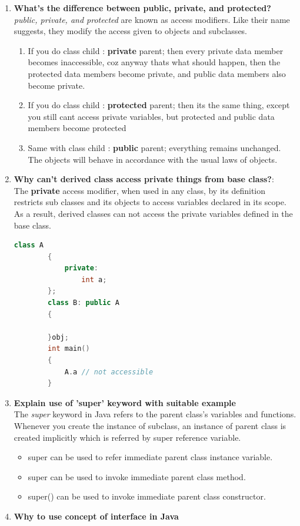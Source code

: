 \documentclass[11pt]{article}
\begin{document}
\begin{enumerate}
\begin{lstlisting}[language=C++]
	\end{lstlisting}

	\item \textbf{What's the difference between public, private, and protected?} \\
	      \textit{public, private, and protected} are known as access modifiers. Like their name suggests, they modify the access given to objects and subclasses.
	      \begin{enumerate}
		      \item If you do class child : \textbf{private} parent; then every private data member becomes inaccessible, coz anyway thats what should happen, then the protected data members become private, and public data members also become private.
		      \item If you do class child : \textbf{protected} parent; then its the same thing, except you still cant access private variables, but protected and public data members become protected
		      \item Same with class child : \textbf{public} parent; everything remains unchanged. The objects will behave in accordance with the usual laws of objects.
	      \end{enumerate}

	\item \textbf{Why can't derived class access private things from base class?}:\\
	      The \textbf{private} access modifier, when used in any class, by its definition restricts sub classes and its objects to access variables declared in its scope. As a result, derived classes can not access the private variables defined in the base class.
	      \begin{lstlisting}[language=C++]
		class A
		{
			private: 
				int a;
		};
		class B: public A
		{
			
		}obj;
		int main()
		{
			A.a // not accessible
		}
	\end{lstlisting}
	      \pagebreak
	\item \textbf{Explain use of 'super' keyword with suitable example}\\
	      The \textit{super} keyword in Java refers to the parent class's variables and functions. Whenever you create the instance of subclass, an instance of parent class is created implicitly which is referred by super reference variable.

	      \begin{itemize}
		      \item super can be used to refer immediate parent class instance variable.
		      \item super can be used to invoke immediate parent class method.
		      \item super() can be used to invoke immediate parent class constructor.
	      \end{itemize}
	\item \textbf{Why to use concept of interface in Java}\\


\end{enumerate}
\end{document}
